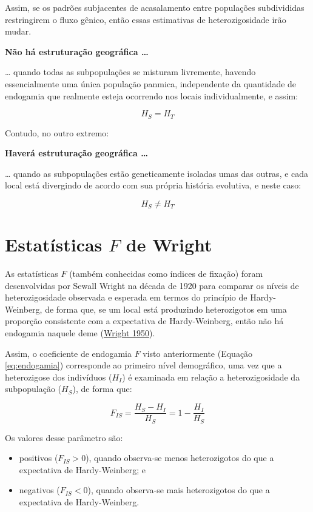 \documentclass[
]{book}
\begin{document}
Assim, se os padrões subjacentes de acasalamento entre populações subdivididas restringirem o fluxo gênico, então essas estimativas de heterozigosidade irão mudar.

\textbf{Não há estruturação geográfica \ldots{}}

\ldots{} quando todas as subpopulações se misturam livremente, havendo essencialmente uma única população panmica, independente da quantidade de endogamia que realmente esteja ocorrendo nos locais individualmente, e assim:

\[H_S = H_T\]

Contudo, no outro extremo:

\textbf{Haverá estruturação geográfica \ldots{}}

\ldots{} quando as subpopulações estão geneticamente isoladas umas das outras, e cada local está divergindo de acordo com sua própria história evolutiva, e neste caso:

\[H_S \ne H_T\]

\hypertarget{estatuxedsticas-f-de-wright}{%
\section{\texorpdfstring{Estatísticas \(F\) de Wright}{Estatísticas F de Wright}}\label{estatuxedsticas-f-de-wright}}

As estatísticas \(F\) (também conhecidas como índices de fixação) foram desenvolvidas por Sewall Wright na década de 1920 para comparar os níveis de heterozigosidade observada e esperada em termos do princípio de Hardy-Weinberg, de forma que, se um local está produzindo heterozigotos em uma proporção consistente com a expectativa de Hardy-Weinberg, então não há endogamia naquele deme (\href{https://doi.org/10.1038/166247a0}{Wright 1950}).

Assim, o coeficiente de endogamia \(F\) visto anteriormente (Equação \eqref{eq:endogamia}) corresponde ao primeiro nível demográfico, uma vez que a heterozigose dos indivíduos (\(H_I\)) é examinada em relação a heterozigosidade da subpopulação (\(H_S\)), de forma que:

\[F_{IS} = \frac{H_S-H_I}{H_S}=1-\frac{H_I}{H_S}\]

Os valores desse parâmetro são:

\begin{itemize}
\item
  positivos (\(F_{IS}>0\)), quando observa-se menos heterozigotos do que a expectativa de Hardy-Weinberg; e
\item
  negativos (\(F_{IS}<0\)), quando observa-se mais heterozigotos do que a expectativa de Hardy-Weinberg.
\end{itemize}
\end{document}
